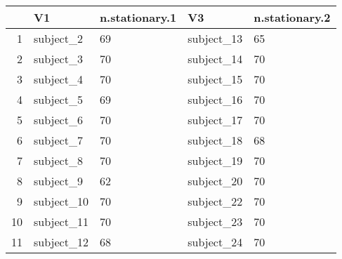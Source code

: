 \begin{table}[ht]
\centering
\begin{tabular}{rllll}
  \hline
 & V1 & n.stationary.1 & V3 & n.stationary.2 \\ 
  \hline
1 & subject\_2 & 69 & subject\_13 & 65 \\ 
  2 & subject\_3 & 70 & subject\_14 & 70 \\ 
  3 & subject\_4 & 70 & subject\_15 & 70 \\ 
  4 & subject\_5 & 69 & subject\_16 & 70 \\ 
  5 & subject\_6 & 70 & subject\_17 & 70 \\ 
  6 & subject\_7 & 70 & subject\_18 & 68 \\ 
  7 & subject\_8 & 70 & subject\_19 & 70 \\ 
  8 & subject\_9 & 62 & subject\_20 & 70 \\ 
  9 & subject\_10 & 70 & subject\_22 & 70 \\ 
  10 & subject\_11 & 70 & subject\_23 & 70 \\ 
  11 & subject\_12 & 68 & subject\_24 & 70 \\ 
   \hline
\end{tabular}
\end{table}
